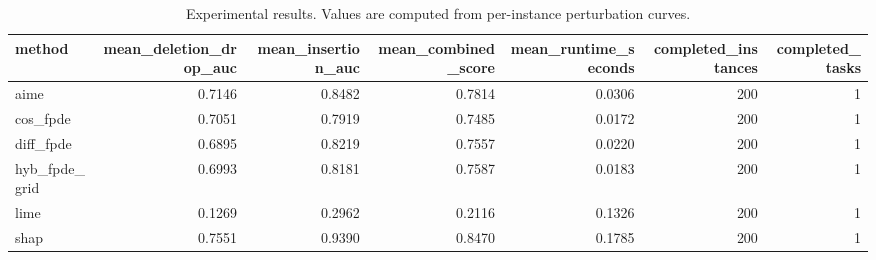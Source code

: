 \begin{table}[t]
\caption{Experimental results. Values are computed from per-instance perturbation curves.}
\label{tab:main_results_computed}
\centering
\begin{tabular}{lrrrrrr}
\toprule
method & mean\_deletion\_drop\_auc & mean\_insertion\_auc & mean\_combined\_score & mean\_runtime\_seconds & completed\_instances & completed\_tasks \\
\midrule
aime & 0.7146 & 0.8482 & 0.7814 & 0.0306 & 200 & 1 \\
cos\_fpde & 0.7051 & 0.7919 & 0.7485 & 0.0172 & 200 & 1 \\
diff\_fpde & 0.6895 & 0.8219 & 0.7557 & 0.0220 & 200 & 1 \\
hyb\_fpde\_grid & 0.6993 & 0.8181 & 0.7587 & 0.0183 & 200 & 1 \\
lime & 0.1269 & 0.2962 & 0.2116 & 0.1326 & 200 & 1 \\
shap & 0.7551 & 0.9390 & 0.8470 & 0.1785 & 200 & 1 \\
\bottomrule
\end{tabular}

\end{table}
